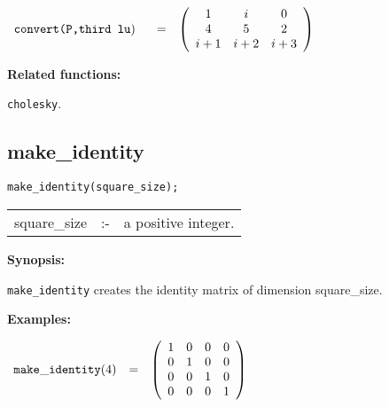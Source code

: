 \begin{flushleft}
\hspace*{0.1in}
\begin{math}
\begin{array}{ccc}
${\tt convert({\cal P},third lu}$) \hspace*{0.1in} & = & \left(
\begin{array}{c c c} 1 & i & 0 \\ 4 & 5 & 2 \\ i+1 & i+2 & i+3
 \end{array} \right)
\end{array}
\end{math}
\end{flushleft}

{\bf Related functions:}

\hspace*{0.175in} {\tt cholesky}.


\subsection{make\_identity}


\hspace*{0.175in} {\tt make\_identity(square\_size);}

\hspace*{0.1in}
\begin{tabular}{l l l}
square\_size &:-& a positive integer.
\end{tabular}

{\bf Synopsis:} %

\hspace*{0.175in} {\tt make\_identity} creates the identity matrix of
                dimension square\_size.

{\bf Examples:}

\begin{flushleft}
\hspace*{0.1in}
\begin{math}
\begin{array}{ccc}
{\tt make\_identity}(4) & = &
        \left( \begin{array}{cccc} 1 & 0 & 0 & 0 \\ 0 & 1 & 0 & 0 \\ 0
& 0 & 1 & 0 \\ 0 & 0 & 0 & 1
 \end{array} \right)
\end{array}
\end{math}
\end{flushleft}

